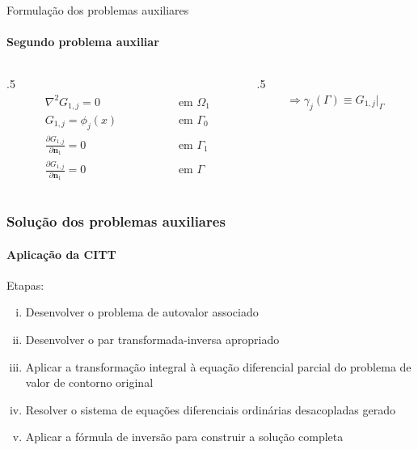 \documentclass{beamer}
\begin{document}
\begin{frame}{Formulação dos problemas auxiliares}
	\framesubtitle{Segundo problema auxiliar}
	\begin{columns}
	\begin{column}{.5\textwidth}
	\begin{subequations}
		\begin{alignat*}{2}
		& \nabla^2 G_{1,j} = 0 \quad\quad\quad\quad\quad && \text{ em } \Omega_1  \\ 
		& G_{1,j} = \phi_j(x) && \text{ em } \Gamma_0  \\
		& \frac{\partial G_{1,j}}{\partial \mathbf{n}_1} = 0 && \text{ em }  \Gamma_1  \\ 
		& \frac{\partial G_{1,j}}{\partial\mathbf{n}_1} = 0 \quad\quad\quad\quad\quad && \text{ em }  \Gamma 
		\end{alignat*}
	\end{subequations}
	\end{column}

	\begin{column}{.5\textwidth}
		\begin{align*}
		\Rightarrow \gamma_j(\Gamma) \equiv G_{1,j}\big|_\Gamma
	\end{align*}
	\end{column}
	\end{columns}

	\begin{center}
	\end{center}
\end{frame}

\begin{frame}
	\frametitle{Solução dos problemas auxiliares}
	\framesubtitle{Aplicação da CITT}
	
	Etapas:
	
	\begin{enumerate}[(i)]
		\item Desenvolver o problema de autovalor associado
		\item Desenvolver o par transformada-inversa apropriado
		\item Aplicar a transformação integral à equação diferencial parcial do problema de valor de contorno original
		\item Resolver o sistema de equações diferenciais ordinárias desacopladas gerado
		\item Aplicar a fórmula de inversão para construir a solução completa
	\end{enumerate}
\end{frame}
\end{document}
